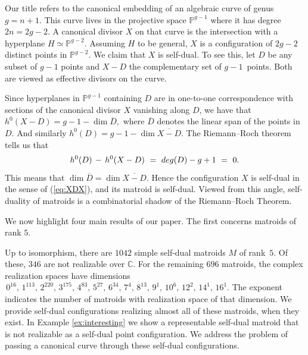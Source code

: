 \documentclass[12pt]{extarticle}
\theoremstyle{definition}
\numberwithin{theorem}{section}
\theoremstyle{plain}\newtheorem{ithm}{Theorem}
\newcommand{\PP}{\mathbb{P}}
\newcommand{\CC}{\mathbb{C} }
\newenvironment{customthm}[1]
{\renewcommand\theinnercustomthm{#1}\innercustomthm}
{\endinnercustomthm}
\begin{document}
Our title refers to the canonical
embedding of an algebraic curve of genus $g=n+1$.
This curve lives in the projective space $\PP^{g-1}$ where it has
degree $2n=2g-2$. A canonical divisor $X$ on that curve is
the intersection with a hyperplane $H \simeq \PP^{g-2}$.
Assuming $H$ to be general, $X$ is
 a configuration of $2g-2$ distinct points in $\PP^{g-2}$.
 We claim that $X$ is self-dual. To see this, let
  $D$ be any subset of $g-1$ points and $X-D$ the
complementary set of $g-1$~points. Both are viewed as 
effective divisors on the curve.


Since hyperplanes in $\PP^{g-1}$ containing $D$ are in one-to-one correspondence with sections of the canonical divisor $X$ vanishing along $D$, we have that
$h^0(X-D)  =  g-1 - \dim \overline{D},$
where $\overline{D}$ denotes the linear span of the points in $D$. And similarly
$h^0(D) =  g-1 - \dim \overline{X - D}.$
The Riemann--Roch theorem tells us that
$$h^0(D) \, -\, h^0(X - D) \,\, = \,\, {\rm deg}(D) - g + 1 \,\, = \,\, 0.$$
This means that $\dim \overline{D} = \dim \overline{X - D}$.
Hence the configuration $X$ is self-dual in the sense of (\ref{eq:XDX}), and its matroid is self-dual.
Viewed from this angle,
 self-duality of matroids
 is a combinatorial shadow of the Riemann--Roch Theorem.

\smallskip

We now highlight four main results of our paper. 
The first concerns matroids of rank $5$.

\begin{customthm}{\ref{thm:1042}}
Up to isomorphism, there are $1042$ simple self-dual matroids $M$ of rank~$5$. 
Of these, $346$ are not realizable over $\CC$. For the remaining $696$ 
matroids, the complex realization spaces  have dimensions
$\,0^{16}, \,1^{113},\, 2^{220}, \,3^{175}, \, 4^{83},\, 5^{27},\, 6^{34}, \, 7^4,\, 8^{13},\, 9^1, \,10^6,\, 12^2,\, 14^1, \,16^1.$ 
\end{customthm}
The exponent indicates the number of matroids with realization space of that dimension.
We provide self-dual configurations realizing almost all of these matroids, when they exist. In Example \ref{ex:interesting} we show a representable self-dual matroid that is not realizable as a self-dual point configuration.
We address the problem of passing a canonical curve through these self-dual configurations.  
\end{document}
